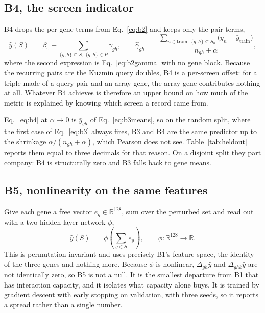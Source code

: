 \subsection{B4, the screen indicator}
\label{sec:b4}

B4 drops the per-gene terms from Eq.~\ref{eq:b2} and keeps only the pair terms,
%
\begin{equation}
  \hat{y}(S) \;=\; \beta_0 + \sum_{\{g,h\} \subseteq S,\; \{g,h\} \in P} \gamma_{gh} ,
  \qquad
  \hat{\gamma}_{gh} \;=\; \frac{\sum_{n \in \mathrm{train},\; \{g,h\} \subseteq S_n}
  \bigl(y_n - \bar{y}_{\mathrm{train}}\bigr)}{n_{gh} + \alpha} ,
  \label{eq:b4}
\end{equation}
%
where the second expression is Eq.~\ref{eq:b2gamma} with no gene block. Because the
recurring pairs are the Kuzmin query doubles, B4 is a per-screen offset: for a
triple made of a query pair and an array gene, the array gene contributes nothing
at all. Whatever B4 achieves is therefore an upper bound on how much of the metric
is explained by knowing which screen a record came from.

Eq.~\ref{eq:b4} at $\alpha \to 0$ is $\bar{y}_{gh}$ of Eq.~\ref{eq:b3means}, so on
the random split, where the first case of Eq.~\ref{eq:b3} always fires, B3 and B4
are the same predictor up to the shrinkage $\alpha/(n_{gh}+\alpha)$, which Pearson
does not see. Table~\ref{tab:heldout} reports them equal to three decimals for that
reason. On a disjoint split they part company: B4 is structurally zero and B3 falls
back to gene means.

\subsection{B5, nonlinearity on the same features}

Give each gene a free vector $e_g \in \mathbb{R}^{128}$, sum over the perturbed set
and read out with a two-hidden-layer network $\phi$,
%
\begin{equation}
  \hat{y}(S) \;=\; \phi\!\left(\sum_{g \in S} e_g\right),
  \qquad
  \phi : \mathbb{R}^{128} \to \mathbb{R}.
  \label{eq:b5}
\end{equation}
%
This is permutation invariant and uses precisely B1's feature space, the identity of
the three genes and nothing more. Because $\phi$ is nonlinear, $\Delta_{gh}\hat{y}$
and $\Delta_{ghk}\hat{y}$ are not identically zero, so B5 is not a null. It is the
smallest departure from B1 that has interaction capacity, and it isolates what
capacity alone buys. It is trained by gradient descent with early stopping on
validation, with three seeds, so it reports a spread rather than a single number.

